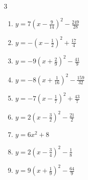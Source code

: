 \begin{multicols}{3}
\begin{enumerate}

  \item $\displaystyle y=7\left( x-\frac{9}{14}\right)^{2}-\frac{249}{28}$


  \item $\displaystyle y=-\left( x-\frac{1}{2}\right)^{2}+\frac{17}{4}$


  \item $\displaystyle y=-9\left( x+\frac{2}{9}\right)^{2}-\frac{41}{9}$


  \item $\displaystyle y=-8\left( x+\frac{1}{16}\right)^{2}-\frac{159}{32}$


  \item $\displaystyle y=-7\left( x-\frac{1}{7}\right)^{2}+\frac{43}{7}$


  \item $\displaystyle y=2\left( x-\frac{3}{2}\right)^{2}-\frac{21}{2}$


  \item $\displaystyle y=6x^{2}+8$

        \phantom{$\displaystyle 頂点\left( 0 , 8 \right)$}

  \item $\displaystyle y=2\left( x-\frac{3}{4}\right)^{2}-\frac{1}{8}$


\columnbreak %

\resetques

  \item $\displaystyle y=9\left( x+\frac{1}{9}\right)^{2}-\frac{64}{9}$



\end{enumerate}
\end{multicols}
